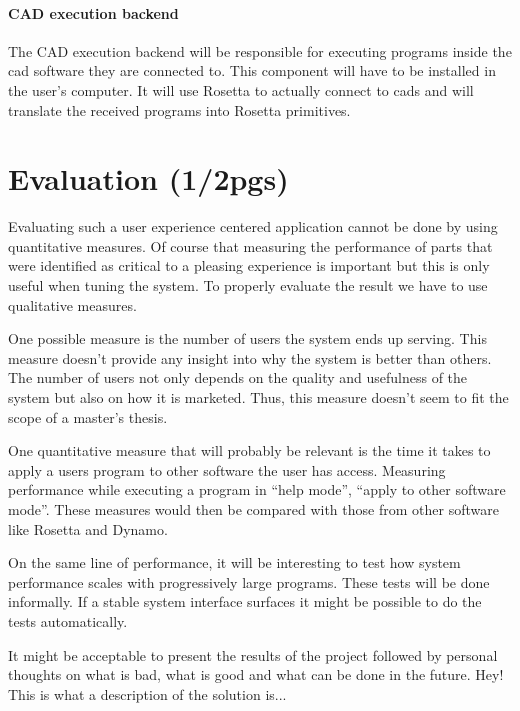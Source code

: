 \documentclass{./llncs2e/llncs}
\begin{document}
	\paragraph{CAD execution backend}
		The CAD execution backend will be responsible for executing programs inside the \ac{cad} software they are connected to.
		This component will have to be installed in the user's computer.
		It will use Rosetta\cite{de2012modern} to actually connect to \ac{cad}s and will translate the received programs into Rosetta primitives.

\section{Evaluation (1/2pgs)}
	Evaluating such a user experience centered application cannot be done by using quantitative measures.
	Of course that measuring the performance of parts that were identified as critical to a pleasing experience is important but this is only useful when tuning the system. 
	To properly evaluate the result we have to use qualitative measures.

	One possible measure is the number of users the system ends up serving.
	This measure doesn't provide any insight into why the system is better than others. 
	The number of users not only depends on the quality and usefulness of the system but also on how it is marketed. 
	Thus, this measure doesn't seem to fit the scope of a master's thesis.

	One quantitative measure that will probably be relevant is the time it takes to apply a users program to other software the user has access.
	Measuring performance while executing a program in ``help mode'', ``apply to other software mode''. 
	These measures would then be compared with those from other software like Rosetta and Dynamo.

	On the same line of performance, it will be interesting to test how system performance scales with progressively large programs.
	These tests will be done informally. 
	If a stable system interface surfaces it might be possible to do the tests automatically.

	It might be acceptable to present the results of the project followed by personal thoughts on what is bad, what is good and what can be done in the future.
	Hey! This is what a description of the solution is...

\end{document}
